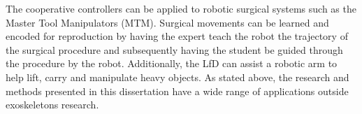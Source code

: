 The cooperative controllers can be applied to robotic surgical systems such as the Master Tool Manipulators (MTM). Surgical movements can be learned and encoded for reproduction by having the expert teach the robot the trajectory of the surgical procedure and subsequently having the student be guided through the procedure by the robot. Additionally, the LfD can assist a robotic arm to help lift, carry and manipulate heavy objects. As stated above, the research and methods presented in this dissertation have a wide range of applications outside exoskeletons research.  








   